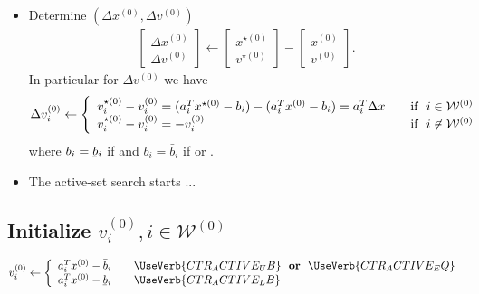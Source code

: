 \documentclass[12pt,a4paper]{article}
\newcommand{\ubar}[1]{\underaccent{\bar}{#1}}
\begin{document}
\begin{itemize}
\item Determine $(\Delta x^{(0)}, \Delta v^{(0)})$
%
  \begin{align*}
    \begin{bmatrix} \Delta x^{(0)} \\ \Delta v^{(0)} \end{bmatrix} \leftarrow
    \begin{bmatrix} x^{\star(0)} \\ v^{\star(0)} \end{bmatrix}  -
    \begin{bmatrix} x^{(0)} \\ v^{(0)} \end{bmatrix}.
  \end{align*}
  In particular for $\Delta v^{(0)}$ we have
  \begin{align*}
    \Delta v_i^{(0)} \leftarrow \left\{
    \begin{array}{l l}
      v_i^{\star(0)} - v_i^{(0)} = (a_i^Tx^{\star(0)} - b_i) - (a_i^Tx^{(0)} - b_i) = a_i^T\Delta x & \quad \text{if} \,\,\,\, i\in\mathcal{W}^{(0)} \\
      v_i^{\star(0)} - v_i^{(0)} = -v_i^{(0)} & \quad \text{if} \,\,\,\, i\not\in\mathcal{W}^{(0)}
    \end{array} \right.
  \end{align*}
  where $b_i = \ubar{b}_i$ if  and $b_i = \bar{b}_i$ if  or .

\item The active-set search starts ...
\end{itemize}

\subsection{Initialize $v_i^{(0)}, i\in\mathcal{W}^{(0)}$}

\begin{align} \label{eq.v0_active}
  v_i^{(0)} \leftarrow \left\{
  \begin{array}{l l}
    a_i^Tx^{(0)} - \bar{b}_i & \quad \UseVerb{CTR_ACTIVE_UB} \,\,\,\, \text{\bf or} \,\,\,\, \UseVerb{CTR_ACTIVE_EQ} \\
    a_i^Tx^{(0)} - \ubar{b}_i & \quad \UseVerb{CTR_ACTIVE_LB}
  \end{array} \right.
\end{align}
\end{document}
